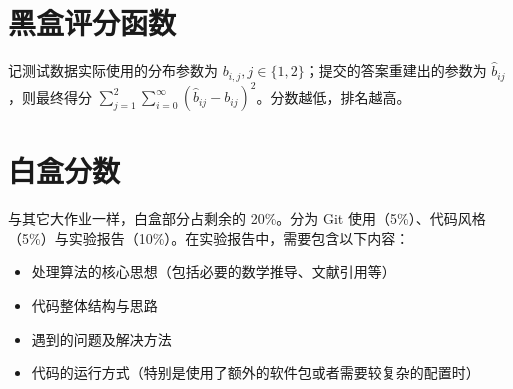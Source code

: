 \documentclass{article}
\begin{document}


\section{黑盒评分函数} %
\label{sec:黑盒评分函数}
记测试数据实际使用的分布参数为 $b_{i,j}, j\in \{1,2\}$；提交的答案重建出的参数为 $\hat{b}_{ij}$，则最终得分 $\displaystyle\sum_{j=1}^{2}\sum_{i=0}^{\infty} \left( \hat{b}_{ij} - b_{ij} \right)^2$。分数越低，排名越高。

\section{白盒分数} %
\label{sec:白盒分数}
与其它大作业一样，白盒部分占剩余的 20\%。分为 Git 使用（5\%）、代码风格（5\%）与实验报告（10\%）。在实验报告中，需要包含以下内容：
\begin{itemize}
    \item 处理算法的核心思想（包括必要的数学推导、文献引用等）
    \item 代码整体结构与思路
    \item 遇到的问题及解决方法
    \item 代码的运行方式（特别是使用了额外的软件包或者需要较复杂的配置时）
\end{itemize}
    
\end{document}
